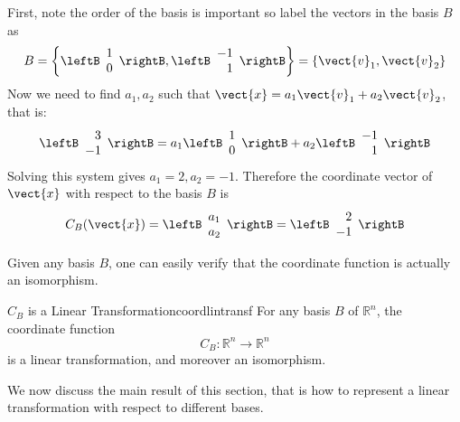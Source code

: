 \begin{solution}
First, note the order of the basis is important so label the vectors in the basis $B$ as 
\[
B = \left\{ \leftB \begin{array}{r}
1 \\
0 
\end{array} \rightB, \leftB \begin{array}{r}
-1 \\
1
\end{array} \rightB \right\} = \left\{ \vect{v}_1, \vect{v}_2 \right\} \]
Now we need to find $a_1, a_2$ such that $\vect{x} = a_1 \vect{v}_1 + a_2 \vect{v}_2$, that is:
\[
\leftB
\begin{array}{r}
3 \\
-1
\end{array}
\rightB
=
a_1 
\leftB \begin{array}{r}
1 \\
0 
\end{array} \rightB
+ a_2
\leftB \begin{array}{r}
-1 \\
1 
\end{array} \rightB\]
Solving this system gives $a_1 = 2, a_2 = -1$. Therefore the coordinate vector of $\vect{x}$ with respect to the basis $B$ is 
\[
C_B(\vect{x})
=
\leftB \begin{array}{r}
a_1 \\
a_2 
\end{array}\rightB
= \leftB \begin{array}{r}
2 \\
-1 
\end{array} \rightB
\]
\end{solution}

Given any basis $B$, one can easily verify that the coordinate function is actually an isomorphism. 

\begin{theorem}{$C_B$ is a Linear Transformation}{coordlintransf}
For any basis $B$ of $\mathbb{R}^n$, the coordinate function
\[ C_B: \mathbb{R}^n  \rightarrow \mathbb{R}^n  \]
is a linear transformation, and moreover an isomorphism. 
\end{theorem}

We now discuss the main  result  of this section, that is how
to represent a linear transformation with respect to different
bases.


